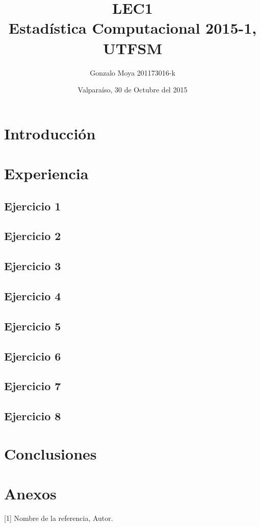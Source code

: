 \documentclass[letter,10pt]{article}
\title{LEC1 \\ Estadística Computacional 2015-1, UTFSM }
\author{Gonzalo Moya 201173016-k}
\date{\vspace*{1cm} Valparaíso, 30 de Octubre del 2015}
\begin{document}
\maketitle
\thispagestyle{empty}
\newpage
\tableofcontents

\makeatother

\newpage

\section{Introducción}
\section{Experiencia}
\subsection{Ejercicio 1}
\subsection{Ejercicio 2}
\subsection{Ejercicio 3}
\subsection{Ejercicio 4}

\subsection{Ejercicio 5}

\subsection{Ejercicio 6}

\subsection{Ejercicio 7}

\subsection{Ejercicio 8}


\section{Conclusiones}

\section{Anexos}





[1] Nombre de la referencia, Autor.
\end{document}
